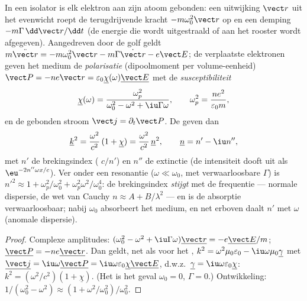 \begin{proposition}\label{prop:b2:waves-in-media:lorentz}
In een isolator is elk elektron aan zijn atoom gebonden: een uitwijking
$\vect r$ uit het evenwicht roept de terugdrijvende kracht
$-m\omega_0^2\vect r$ op en een demping $-m\Gamma\,\dd\vect r/\dd t$ (de
energie die wordt uitgestraald of aan het rooster wordt afgegeven).
Aangedreven door de golf geldt
$m\ddot{\vect r} = -m\omega_0^2\vect r - m\Gamma\dot{\vect r}
- e\vect E$;
de verplaatste elektronen geven het medium de \emph{polarisatie}
(dipoolmoment per volume-eenheid)
$\vect P = -ne\vect r = \varepsilon_0\underline\chi(\omega)
\underline{\vect E}$
met de \emph{susceptibiliteit}
\[
\underline\chi(\omega) = \frac{\omega_p^2}{\omega_0^2 - \omega^2 + \iu\Gamma\omega} ,
\qquad \omega_p^2 = \frac{ne^2}{\varepsilon_0m} ,
\]
en de gebonden stroom $\vect j = \partial_t\vect P$. De  geven dan
\[
\underline k^2 = \frac{\omega^2}{c^2}\,(1 + \underline\chi) = \frac{\omega^2}{c^2}\,\underline n^2 ,
\qquad \underline n = n' - \iu n'' ,
\]
met $n'$ de brekingsindex ( $c/n'$) en $n''$ de extinctie (de
intensiteit dooft uit als $\eu^{-2n''\omega x/c}$). Ver onder een resonantie
($\omega \ll \omega_0$, met verwaarloosbare $\Gamma$) is
$n'^2 \approx 1 + \omega_p^2/\omega_0^2 +
\omega_p^2\omega^2/\omega_0^4$: de
brekingsindex \emph{stijgt} met de frequentie --- normale dispersie, de wet
van Cauchy $n \approx A + B/\lambda^2$ --- en is de absorptie
verwaarloosbaar; nabij $\omega_0$ absorbeert het medium, en net erboven
daalt $n'$ met $\omega$ (anomale dispersie).
\end{proposition}

\begin{proof}
Complexe amplitudes:
$(\omega_0^2 - \omega^2 + \iu\Gamma\omega)\underline{\vect r} = -e\underline{\vect E}
/m$;
$\underline{\vect P} = -ne\underline{\vect r}$. Dan geldt, net als voor het
, $k^2 = \omega^2\mu_0
\varepsilon_0 - \iu\omega\mu_0\underline\gamma$
met
$\underline{\vect j} = \iu\omega\underline{\vect P} = \iu\omega\varepsilon_0
\underline\chi\underline{\vect E}$,
d.w.z.\ $\underline\gamma = \iu\omega\varepsilon_0\underline\chi$:
$k^2 = (\omega^2/c^2)
(1 + \underline\chi)$. (Het  is het geval
$\omega_0 = 0$, $\Gamma = 0$.) Ontwikkeling:
$1/(\omega_0^2 - \omega^2) \approx (1 + \omega^2/\omega_0^2)/\omega_0^2$.
\end{proof}

